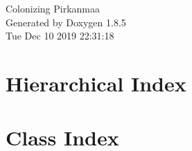 \documentclass[twoside]{book}
\newcommand{\clearemptydoublepage}{%
  \newpage{\pagestyle{empty}\cleardoublepage}%
}
\begin{document}
\hypersetup{pageanchor=false}
\begin{titlepage}
\vspace*{7cm}
\begin{center}%
{\Large Colonizing Pirkanmaa }\\
\vspace*{1cm}
{\large Generated by Doxygen 1.8.5}\\
\vspace*{0.5cm}
{\small Tue Dec 10 2019 22:31:18}\\
\end{center}
\end{titlepage}
\clearemptydoublepage
\tableofcontents
\clearemptydoublepage
{}
\hypersetup{pageanchor=true}

\chapter{Hierarchical Index}

\chapter{Class Index}

\end{document}
